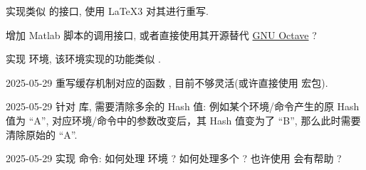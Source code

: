 \documentclass[
  hyper, lang=cn, 
  class=l3dox, 
]{../../zlatex/code/ztex}
\begin{document}
\let\olditem\item
{}
  {
      {\color{black}%
        \olditem{}\color{gray}}
      {\color{black}%
        \olditem}
  }
\begin{todolist}
  \item 实现类似  的接口, 使用 \LaTeX3 对其进行重写.
  \item *[参考后续 ``\env{wolframAny}'' 环境的处理方法]增加 Matlab 脚本的调用接口, 或者直接使用其开源替代 \href{https://octave.org/}{GNU Octave} ?
  \item *[参考 \pkg{cache} 库一节中 ``\env{mermaid}'' 环境的实现]实现  环境, 该环境实现的功能类似 .
  \item [2025-05-29]重写缓存机制对应的函数 , 目前不够灵活(或许直接使用 \href{https://github.com/leo-colisson/robust-externalize}{} 宏包).
  \item [2025-05-29]针对  库, 需要清除多余的 Hash 值: 例如某个环境/命令产生的原 Hash 值为 ``A'', 对应环境/命令中的参数改变后，其 Hash 值变为了 ``B'', 那么此时需要清除原始的 ``A''.
  \item [2025-05-29]实现  命令: 如何处理  环境 ? 如何处理多个  ? 也许使用  会有帮助 ?
\end{todolist}


\ztexDocPrintSource


\renewcommand\indexname{索引}
\PrintIndex
\end{document}
